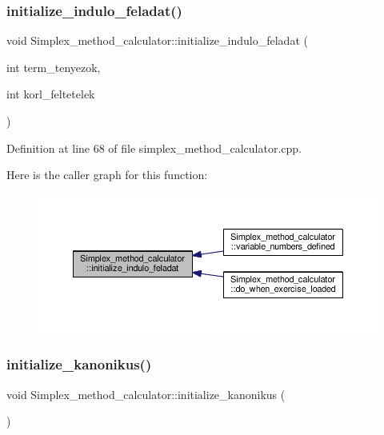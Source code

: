 \subsubsection{\texorpdfstring{initialize\+\_\+indulo\+\_\+feladat()}{initialize\_indulo\_feladat()}}
{\footnotesize\ttfamily void Simplex\+\_\+method\+\_\+calculator\+::initialize\+\_\+indulo\+\_\+feladat (\begin{DoxyParamCaption}\item[{int}]{term\+\_\+tenyezok,  }\item[{int}]{korl\+\_\+feltetelek }\end{DoxyParamCaption})\hspace{0.3cm}{\ttfamily [private]}}



Definition at line 68 of file simplex\+\_\+method\+\_\+calculator.\+cpp.

Here is the caller graph for this function\+:\nopagebreak
\begin{figure}[H]
\begin{center}
\leavevmode
\includegraphics[width=350pt]{classSimplex__method__calculator_a9a139d8cdb7be97eff44c7143a8b915c_icgraph}
\end{center}
\end{figure}
\mbox{\label{classSimplex__method__calculator_abb2932fa0eddff8f3a3737513cad8ece}} 
\subsubsection{\texorpdfstring{initialize\+\_\+kanonikus()}{initialize\_kanonikus()}}
{\footnotesize\ttfamily void Simplex\+\_\+method\+\_\+calculator\+::initialize\+\_\+kanonikus (\begin{DoxyParamCaption}{ }\end{DoxyParamCaption})\hspace{0.3cm}{\ttfamily [private]}}



